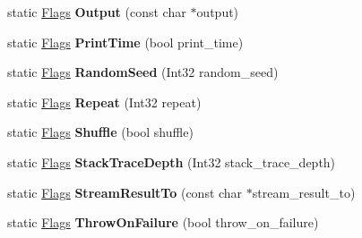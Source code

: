 \begin{DoxyCompactItemize}
static \hyperlink{structtesting_1_1Flags}{Flags} {\bfseries Output} (const char $\ast$output)
\item 
\mbox{\label{structtesting_1_1Flags_af4dc8454995fb3691399a049e95de179}} 
static \hyperlink{structtesting_1_1Flags}{Flags} {\bfseries Print\+Time} (bool print\+\_\+time)
\item 
\mbox{\label{structtesting_1_1Flags_a695cd8b8ab44df5eaa371bacded78c05}} 
static \hyperlink{structtesting_1_1Flags}{Flags} {\bfseries Random\+Seed} (Int32 random\+\_\+seed)
\item 
\mbox{\label{structtesting_1_1Flags_a19d47e87d77a18ef4fa8a85b74e25956}} 
static \hyperlink{structtesting_1_1Flags}{Flags} {\bfseries Repeat} (Int32 repeat)
\item 
\mbox{\label{structtesting_1_1Flags_a19ddbbaed61bda44a1940333b7c5a469}} 
static \hyperlink{structtesting_1_1Flags}{Flags} {\bfseries Shuffle} (bool shuffle)
\item 
\mbox{\label{structtesting_1_1Flags_a16b01d8bcceaa9fa8211fd24faa75b5a}} 
static \hyperlink{structtesting_1_1Flags}{Flags} {\bfseries Stack\+Trace\+Depth} (Int32 stack\+\_\+trace\+\_\+depth)
\item 
\mbox{\label{structtesting_1_1Flags_a9cf0f64310b28eadbbfbb35584ebfc71}} 
static \hyperlink{structtesting_1_1Flags}{Flags} {\bfseries Stream\+Result\+To} (const char $\ast$stream\+\_\+result\+\_\+to)
\item 
\mbox{\label{structtesting_1_1Flags_ad856df862414ed0dadf80b5e03829cc7}} 
static \hyperlink{structtesting_1_1Flags}{Flags} {\bfseries Throw\+On\+Failure} (bool throw\+\_\+on\+\_\+failure)
\end{DoxyCompactItemize}
